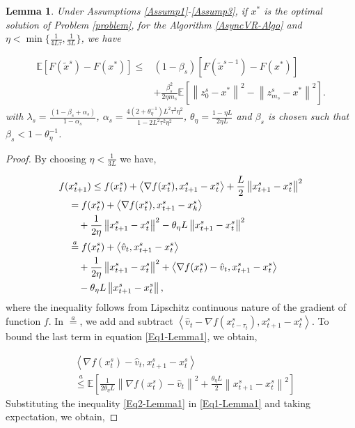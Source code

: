 \documentclass{article}
\newcommand*{\E}{\mathbb{E}}
\newcommand{\norm}[1]{\left\lVert#1\right\rVert}
\newcommand{\Iprod}[2]{\left\langle #1,#2\right\rangle}
\newtheorem{lemma}[theorem]{Lemma}
\theoremstyle{definition}
\theoremstyle{remark}
\begin{document}
{\color{Brown}
\begin{lemma}\label{lemma1}
Under Assumptions \ref{Assump1}-\ref{Assump3}, if $x^*$ is the optimal solution of Problem \eqref{problem}, for the Algorithm \ref{AsyncVR-Algo} and $\eta < \min\{\frac{1}{4L
\tau}, \frac{1}{3L}\}$, we have 

\begin{equation}
\begin{split}
\E[F(\widetilde{x}^s)-F(x^*)] \leq &(1-\beta_s)[F(\widetilde{x}^{s-1})-F(x^*)] \\
&+ {\frac{ \beta_s^2}{2\eta m_s}}\E[\norm{z_{0}^s-x^*}^2-\norm{z_{m_s}^s-x^*}^2]. 
\end{split}
\end{equation}
with $\lambda_s = \frac{(1-\beta_s+\alpha_s)}{1-\alpha_s}$, $\alpha_s=\frac{4(2+\theta_{\eta}^{-1})L^2\tau^2\eta^2}{1-2L^2 \tau^2\eta^2}$, $\theta_{\eta} = \frac{1-\eta L}{2\eta L}$ and $\beta_s$ is chosen such that $\beta_s < 1-\theta_{\eta}^{-1}$.
\end{lemma}
\begin{proof}
By choosing $\eta < \frac{1}{3L}$ we have,

\begin{gather}
\label{Eq1-Lemma1}
\begin{split}
f(&x_{t+1}^s)  \leq f(x_{t}^s) + \Iprod{\nabla f(x_{t}^s)}{x_{t+1}^s-x_{t}^s}+\frac{L}{2}\norm{x_{t+1}^s-x_{t}^s}^2\\
&=f(x_{t}^s) + \Iprod{\nabla f(x_{t}^s)}{x_{t+1}^s-x_{k}^s}\\
&~~~+ {\frac{1 }{2\eta}}\norm{x_{t+1}^s-x_{t}^s}^2-{\theta_{\eta} L}\norm{x_{t+1}^s-x_{t}^s}^2\\
&\stackrel{a}{=}f(x_{t}^s) + \Iprod{\hat{v}_{t}}{x_{t+1}^s-x_{t}^s}\\
&~~~+ { \frac{1}{2\eta}}\norm{x_{t+1}^s-x_{t}^s}^2+\Iprod{\nabla f(x_{t}^s)-\hat{v}_{t}}{x_{t+1}^s-x_{t}^s}\\
&~~~-{\theta_{\eta} L}\norm{x_{t+1}^s-x_{t}^s},
\end{split}
\raisetag{15pt}
\end{gather}
where the inequality follows from Lipschitz continuous nature of the gradient of function $f$. In $\stackrel{a}{=}$, we add and subtract $\Iprod{\hat{v}_{t}-\nabla f(x_{t-\tau_t}^s)}{x_{t+1}^s-x_{t}^s}$. 
To bound the last term in equation \eqref{Eq1-Lemma1}, we obtain,

\begin{equation}\label{Eq2-Lemma1}
\begin{split}
&\Iprod{\nabla f(x_{t}^s)-\hat{v}_{t}}{x_{t+1}^s-x_{t}^s}\\
&\stackrel{a}{\leq} \E\left[\frac{1}{2\theta_{\eta} L}\norm{\nabla f(x_{t}^s)-\hat{v}_{t}}^2 + \frac{\theta_{\eta} L}{2}\norm{x_{t+1}^s-x_{t}^s}^2\right]
\end{split}
\end{equation}
Substituting the inequality \eqref{Eq2-Lemma1} in \eqref{Eq1-Lemma1} and taking expectation, we obtain,


\end{proof}}
\end{document}
